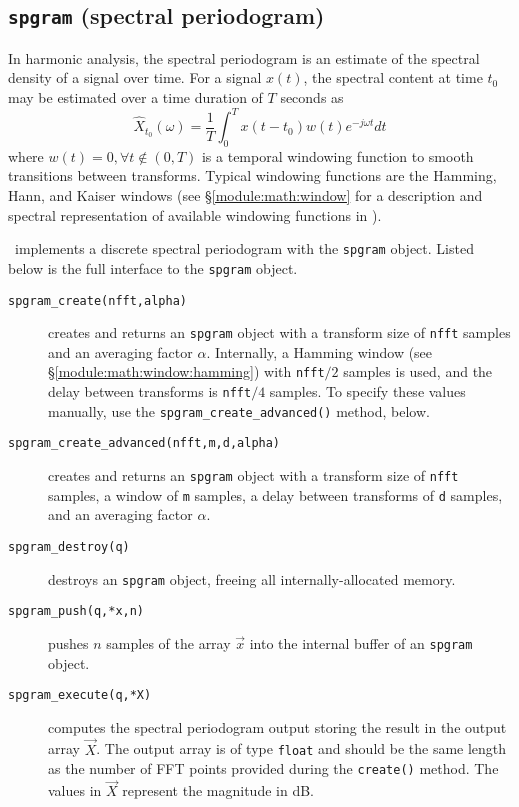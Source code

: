 %

%
%
\subsection{{\tt spgram} (spectral periodogram)}
\label{module:fft:spgram}

In harmonic analysis, the spectral periodogram is an estimate of the
spectral density of a signal over time.
For a signal $x(t)$, the spectral content at time $t_0$ may be estimated
over a time duration of $T$ seconds as
\[
    \hat{X}_{t_0}(\omega) =
        \frac{1}{T} \int_{0}^{T} { x(t-t_0)w(t)e^{-j\omega t} dt }
\]
where $w(t) = 0,\forall t \notin (0,T)$
is a temporal windowing function to smooth transitions
between transforms.
Typical windowing functions are the Hamming, Hann, and Kaiser windows
(see \S\ref{module:math:window} for a description and spectral
representation of available windowing functions in \liquid).

\liquid\ implements a discrete spectral periodogram with the
{\tt spgram} object.
%
Listed below is the full interface to the {\tt spgram} object.
%
\begin{description}
\item[{\tt spgram\_create(nfft,alpha)}]
    creates and returns an {\tt spgram} object with a transform size of
    {\tt nfft} samples and an averaging factor $\alpha$.
    Internally,
    a Hamming window (see \S\ref{module:math:window:hamming})
    with {\tt nfft}$/2$ samples is used,
    and the delay between transforms is {\tt nfft}$/4$ samples.
    To specify these values manually, use the
    {\tt spgram\_create\_advanced()} method, below.
\item[{\tt spgram\_create\_advanced(nfft,m,d,alpha)}]
    creates and returns an {\tt spgram} object with
    a transform size of {\tt nfft} samples,
    a window of {\tt m} samples,
    a delay between transforms of {\tt d} samples,
    and an averaging factor $\alpha$.
\item[{\tt spgram\_destroy(q)}]
    destroys an {\tt spgram} object, freeing all internally-allocated
    memory.
\item[{\tt spgram\_push(q,*x,n)}]
    pushes $n$ samples of the array $\vec{x}$ into the internal buffer
    of an {\tt spgram} object.
\item[{\tt spgram\_execute(q,*X)}]
    computes the spectral periodogram output storing the result in the
    output array $\vec{X}$.
    The output array is of type {\tt float} and should be the
    same length as the number of FFT points provided during the
    {\tt create()} method.
    The values in $\vec{X}$ represent the magnitude in dB.
\end{description}

